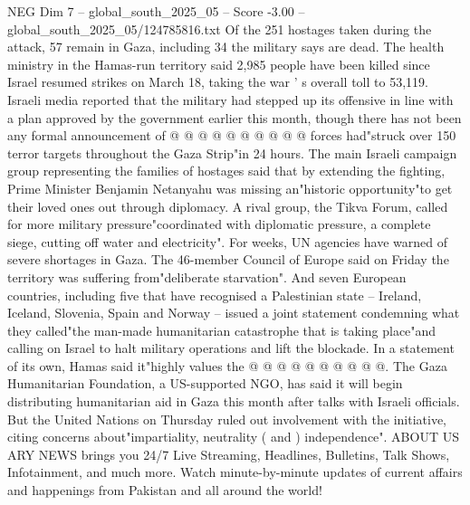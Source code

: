 \begin{textsample}{NEG Dim 7 – global\_south\_2025\_05 – Score -3.00 – global\_south\_2025\_05/124785816.txt}
Of the 251 hostages taken during the attack, 57 remain in Gaza, including 34 the military says are dead.
The health ministry in the Hamas-run territory said 2,985 people have been killed since Israel resumed strikes on March 18, taking the war ' s overall toll to 53,119.
Israeli media reported that the military had stepped up its offensive in line with a plan approved by the government earlier this month, though there has not been any formal announcement of @ @ @ @ @ @ @ @ @ @ forces had"struck over 150 terror targets throughout the Gaza Strip"in 24 hours.
The main Israeli campaign group representing the families of hostages said that by extending the fighting, Prime Minister Benjamin Netanyahu was missing an"historic opportunity"to get their loved ones out through diplomacy.
A rival group, the Tikva Forum, called for more military pressure"coordinated with diplomatic pressure, a complete siege, cutting off water and electricity".
For weeks, UN agencies have warned of severe shortages in Gaza.
The 46-member Council of Europe said on Friday the territory was suffering from"deliberate starvation".
And seven European countries, including five that have recognised a Palestinian state -- Ireland, Iceland, Slovenia, Spain and Norway -- issued a joint statement condemning what they called"the man-made humanitarian catastrophe that is taking place"and calling on Israel to halt military operations and lift the blockade.
In a statement of its own, Hamas said it"highly values the @ @ @ @ @ @ @ @ @ @.
The Gaza Humanitarian Foundation, a US-supported NGO, has said it will begin distributing humanitarian aid in Gaza this month after talks with Israeli officials.
But the United Nations on Thursday ruled out involvement with the initiative, citing concerns about"impartiality, neutrality ( and ) independence".
ABOUT US ARY NEWS brings you 24/7 Live Streaming, Headlines, Bulletins, Talk Shows, Infotainment, and much more.
Watch minute-by-minute updates of current affairs and happenings from Pakistan and all around the world!

\end{textsample}
